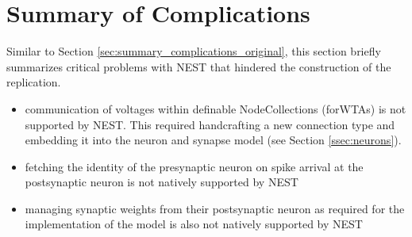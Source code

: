 \section{Summary of Complications} \label{sec:summary_complications_implementation}
Similar to Section \ref{sec:summary_complications_original}, this section briefly summarizes critical problems with NEST that hindered the construction of the replication.
\begin{itemize}
    \item communication of voltages within definable NodeCollections (for\linebreak WTAs) is not supported by NEST. This required handcrafting a new connection type and embedding it into the neuron and synapse model (see Section \ref{ssec:neurons}).
    \item fetching the identity of the presynaptic neuron on spike arrival at the postsynaptic neuron is not natively supported by NEST
    \item managing synaptic weights from their postsynaptic neuron as required for the implementation of the model is also not natively supported by NEST
\end{itemize}

